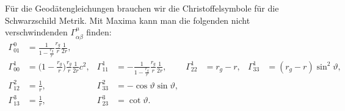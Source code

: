 %
Für die Geodätengleichungen brauchen wir die Christoffelsymbole 
für die Schwarzschild Metrik.
Mit Maxima kann man die folgenden nicht verschwindenden
$\Gamma^\mu_{\alpha\beta}$ 
finden:
\begin{align*}
\Gamma^0_{01}
&=
\frac{1}{1-\displaystyle\frac{r_g}{r}}
\frac{r_g}{r}
\frac{1}{2r},
\\
\Gamma^1_{00}
&=
\biggl(1-\displaystyle\frac{r_g}{r}\biggr)
\frac{r_g}{r}
\frac{1}{2r}c^2,
&
\Gamma^1_{11}
&=
-\frac1{1-\displaystyle\frac{r_g}{r}}
\frac{r_g}{r}
\frac{1}{2r},
&
\Gamma^1_{22}
&=
r_g-r,
&
\Gamma^1_{33}
&=
(r_g-r)\sin^2\vartheta,
\\
\Gamma^2_{12}
&=
\frac1r,
&
\Gamma^2_{33}
&=
-\cos\vartheta \sin\vartheta,
\\
\Gamma^3_{13}
&=
\frac1r,
&
\Gamma^3_{23}
&=
\cot\vartheta.
\end{align*}
